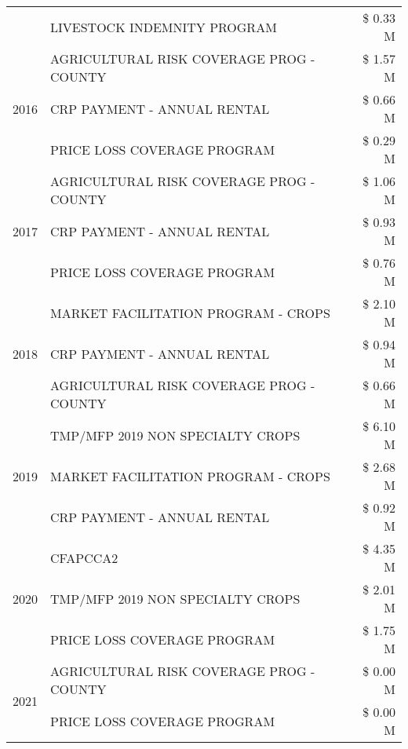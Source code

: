 \begin{tabular}{llr}
 & LIVESTOCK INDEMNITY PROGRAM & \$ 0.33 M \\
\cline{1-3}
\multirow[t]{3}{*}{2016} & AGRICULTURAL RISK COVERAGE PROG - COUNTY & \$ 1.57 M \\
 & CRP PAYMENT - ANNUAL RENTAL & \$ 0.66 M \\
 & PRICE LOSS COVERAGE PROGRAM & \$ 0.29 M \\
\cline{1-3}
\multirow[t]{3}{*}{2017} & AGRICULTURAL RISK COVERAGE PROG - COUNTY & \$ 1.06 M \\
 & CRP PAYMENT - ANNUAL RENTAL & \$ 0.93 M \\
 & PRICE LOSS COVERAGE PROGRAM & \$ 0.76 M \\
\cline{1-3}
\multirow[t]{3}{*}{2018} & MARKET FACILITATION PROGRAM - CROPS & \$ 2.10 M \\
 & CRP PAYMENT - ANNUAL RENTAL & \$ 0.94 M \\
 & AGRICULTURAL RISK COVERAGE PROG - COUNTY & \$ 0.66 M \\
\cline{1-3}
\multirow[t]{3}{*}{2019} & TMP/MFP 2019 NON SPECIALTY CROPS & \$ 6.10 M \\
 & MARKET FACILITATION PROGRAM - CROPS & \$ 2.68 M \\
 & CRP PAYMENT - ANNUAL RENTAL & \$ 0.92 M \\
\cline{1-3}
\multirow[t]{3}{*}{2020} & CFAPCCA2 & \$ 4.35 M \\
 & TMP/MFP 2019 NON SPECIALTY CROPS & \$ 2.01 M \\
 & PRICE LOSS COVERAGE PROGRAM & \$ 1.75 M \\
\cline{1-3}
\multirow[t]{2}{*}{2021} & AGRICULTURAL RISK COVERAGE PROG - COUNTY & \$ 0.00 M \\
 & PRICE LOSS COVERAGE PROGRAM & \$ 0.00 M \\
\cline{1-3}
\bottomrule
\end{tabular}

